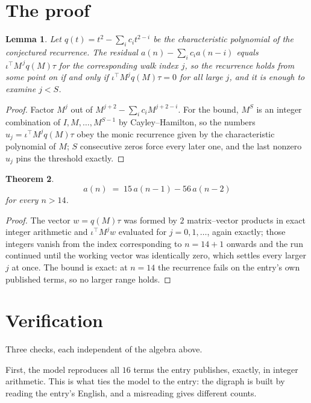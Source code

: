 \documentclass[11pt,a4paper]{article}
\theoremstyle{plain}
\newtheorem{theorem}{Theorem}
\newtheorem{lemma}[theorem]{Lemma}
\theoremstyle{definition}
\begin{document}
\section{The proof}

\begin{lemma}\label{lem:crit}
Let $q(t)=t^{2}-\sum_i c_it^{2-i}$ be the characteristic polynomial of the
conjectured recurrence. The residual $a(n)-\sum_ic_ia(n-i)$ equals
$\iota^{\!\top}M^{\,j}q(M)\tau$ for the corresponding walk index $j$, so the recurrence
holds from some point on if and only if $\iota^{\!\top}M^{j}q(M)\tau=0$ for all large $j$,
and it is enough to examine $j<S$.
\end{lemma}

\begin{proof}
Factor $M^{j}$ out of $M^{j+2}-\sum_ic_iM^{j+2-i}$. For the bound, $M^{S}$
is an integer combination of $I,M,\dots,M^{S-1}$ by Cayley--Hamilton, so the numbers
$u_j=\iota^{\!\top}M^{j}q(M)\tau$ obey the monic recurrence given by the characteristic
polynomial of $M$; $S$ consecutive zeros force every later one, and the last nonzero $u_j$
pins the threshold exactly.
\end{proof}

\begin{theorem}
\[
a(n)\;=\;15\,a(n-1) - 56\,a(n-2)
\]
for every $n>14$.
\end{theorem}

\begin{proof}
The vector $w=q(M)\tau$ was formed by $2$ matrix--vector products in exact integer
arithmetic and $\iota^{\!\top}M^{j}w$ evaluated for $j=0,1,\dots$, again exactly; those
integers vanish from the index corresponding to $n=14+1$ onwards and the run continued
until the working vector was identically zero, which settles every larger $j$ at once. The bound is exact: at $n=14$ the recurrence fails on the entry's own published terms, so no larger range holds.
\end{proof}

\section{Verification}

Three checks, each independent of the algebra above.

First, the model reproduces all $16$ terms the entry publishes, exactly, in integer
arithmetic. This is what ties the model to the entry: the digraph is built by reading the
entry's English, and a misreading gives different counts.
\end{document}
